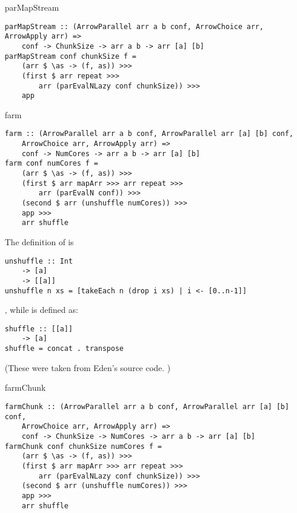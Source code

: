 \begin{frame}[fragile]{parMapStream}
\begin{lstlisting}[frame=htrbl]
parMapStream :: (ArrowParallel arr a b conf, ArrowChoice arr, ArrowApply arr) =>
	conf -> ChunkSize -> arr a b -> arr [a] [b]
parMapStream conf chunkSize f =
	(arr $ \as -> (f, as)) >>>
	(first $ arr repeat >>>
		arr (parEvalNLazy conf chunkSize)) >>>
	app
\end{lstlisting}
\end{frame}

\begin{frame}[fragile]{farm}
\begin{lstlisting}[frame=htrbl]
farm :: (ArrowParallel arr a b conf, ArrowParallel arr [a] [b] conf,
	ArrowChoice arr, ArrowApply arr) =>
	conf -> NumCores -> arr a b -> arr [a] [b]
farm conf numCores f =
	(arr $ \as -> (f, as)) >>>
	(first $ arr mapArr >>> arr repeat >>>
		arr (parEvalN conf)) >>>
	(second $ arr (unshuffle numCores)) >>>
	app >>>
	arr shuffle
\end{lstlisting}
The definition of  is
\begin{lstlisting}[frame=htrbl]
unshuffle :: Int
	-> [a]
	-> [[a]]
unshuffle n xs = [takeEach n (drop i xs) | i <- [0..n-1]]
\end{lstlisting}
, while  is defined as:
\begin{lstlisting}[frame=htrbl]
shuffle :: [[a]]
	-> [a]
shuffle = concat . transpose
\end{lstlisting}
(These were taken from Eden's source code. \cite{eden_skel_shuffle})
\end{frame}

\begin{frame}[fragile]{farmChunk}
\begin{lstlisting}[frame=htrbl]
farmChunk :: (ArrowParallel arr a b conf, ArrowParallel arr [a] [b] conf,
	ArrowChoice arr, ArrowApply arr) =>
	conf -> ChunkSize -> NumCores -> arr a b -> arr [a] [b]
farmChunk conf chunkSize numCores f =
	(arr $ \as -> (f, as)) >>>
	(first $ arr mapArr >>> arr repeat >>>
		arr (parEvalNLazy conf chunkSize)) >>>
	(second $ arr (unshuffle numCores)) >>>
	app >>>
	arr shuffle
\end{lstlisting}
\end{frame}